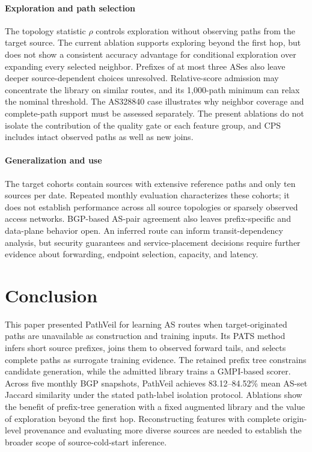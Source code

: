 \documentclass[conference]{IEEEtran}
\newcommand{\sys}{\mbox{PathVeil}\xspace}
\newcommand{\pats}{\mbox{PATS}\xspace}
\begin{document}
\paragraph{Exploration and path selection}
The topology statistic $\rho$ controls exploration without observing
paths from the target source. The current ablation supports exploring
beyond the first hop, but does not show a consistent accuracy advantage
for conditional exploration over expanding every selected neighbor.
Prefixes of at most three ASes also leave deeper source-dependent
choices unresolved. Relative-score admission may concentrate the
library on similar routes, and its 1,000-path minimum can relax the
nominal threshold. The AS328840 case illustrates why neighbor coverage
and complete-path support must be assessed separately. The present
ablations do not isolate the contribution of the quality gate or each
feature group, and CPS includes intact observed paths as well as new
joins.

\paragraph{Generalization and use}
The target cohorts contain sources with extensive reference paths and
only ten sources per date. Repeated monthly evaluation characterizes
these cohorts; it does not establish performance across all source
topologies or sparsely observed access networks. BGP-based AS-pair
agreement also leaves prefix-specific and data-plane behavior open.
An inferred route can inform transit-dependency analysis, but security
guarantees and service-placement decisions require further evidence
about forwarding, endpoint selection, capacity, and latency.

\section{Conclusion}
\label{sec:conclusion}

This paper presented \sys for learning AS routes when target-originated
paths are unavailable as construction and training inputs. Its \pats
method infers short source prefixes, joins them to observed forward
tails, and selects complete paths as surrogate training evidence.
The retained prefix tree constrains candidate generation, while the
admitted library trains a GMPI-based scorer. Across five monthly BGP
snapshots, \sys achieves 83.12--84.52\% mean AS-set Jaccard similarity
under the stated path-label isolation protocol. Ablations show the
benefit of prefix-tree generation with a fixed augmented library and
the value of exploration beyond the first hop. Reconstructing features
with complete origin-level provenance and evaluating more diverse
sources are needed to establish the broader scope of source-cold-start
inference.



\end{document}
